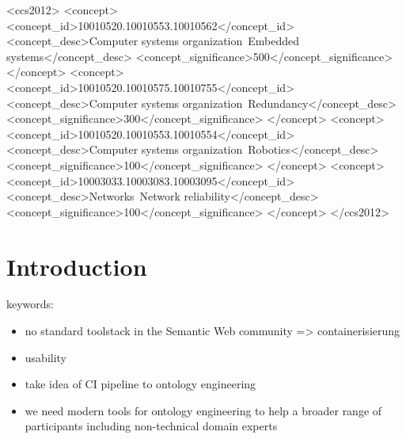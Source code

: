 \documentclass[sigconf]{acmart}
\begin{document}
\begin{CCSXML}
  <ccs2012>
  <concept>
  <concept_id>10010520.10010553.10010562</concept_id>
  <concept_desc>Computer systems organization~Embedded systems</concept_desc>
  <concept_significance>500</concept_significance>
  </concept>
  <concept>
  <concept_id>10010520.10010575.10010755</concept_id>
  <concept_desc>Computer systems organization~Redundancy</concept_desc>
  <concept_significance>300</concept_significance>
  </concept>
  <concept>
  <concept_id>10010520.10010553.10010554</concept_id>
  <concept_desc>Computer systems organization~Robotics</concept_desc>
  <concept_significance>100</concept_significance>
  </concept>
  <concept>
  <concept_id>10003033.10003083.10003095</concept_id>
  <concept_desc>Networks~Network reliability</concept_desc>
  <concept_significance>100</concept_significance>
  </concept>
  </ccs2012>
\end{CCSXML}



\maketitle

\section{Introduction}
keywords:
\begin{itemize}
  \item no standard toolstack in the Semantic Web community => containerisierung 
  \item usability

  \item take idea of CI pipeline to ontology engineering

  \item we need modern tools for ontology engineering to help a broader range of participants including non-technical domain experts
\end{itemize}
\end{document}
